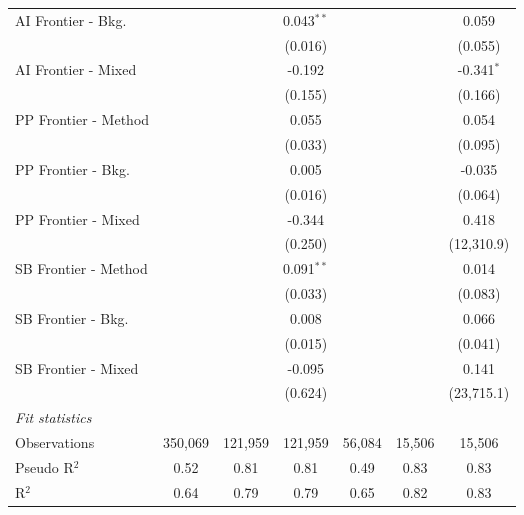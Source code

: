 \begin{tabular}{lcccccc}
   AI Frontier - Bkg.   &               &               & 0.043$^{**}$  &               &              & 0.059\\   
                        &               &               & (0.016)       &               &              & (0.055)\\   
   AI Frontier - Mixed  &               &               & -0.192        &               &              & -0.341$^{*}$\\   
                        &               &               & (0.155)       &               &              & (0.166)\\   
   PP Frontier - Method &               &               & 0.055         &               &              & 0.054\\   
                        &               &               & (0.033)       &               &              & (0.095)\\   
   PP Frontier - Bkg.   &               &               & 0.005         &               &              & -0.035\\   
                        &               &               & (0.016)       &               &              & (0.064)\\   
   PP Frontier - Mixed  &               &               & -0.344        &               &              & 0.418\\   
                        &               &               & (0.250)       &               &              & (12,310.9)\\   
   SB Frontier - Method &               &               & 0.091$^{**}$  &               &              & 0.014\\   
                        &               &               & (0.033)       &               &              & (0.083)\\   
   SB Frontier - Bkg.   &               &               & 0.008         &               &              & 0.066\\   
                        &               &               & (0.015)       &               &              & (0.041)\\   
   SB Frontier - Mixed  &               &               & -0.095        &               &              & 0.141\\   
                        &               &               & (0.624)       &               &              & (23,715.1)\\   
   \midrule
   \emph{Fit statistics}\\
   Observations         & 350,069       & 121,959       & 121,959       & 56,084        & 15,506       & 15,506\\  
   Pseudo R$^2$         & 0.52          & 0.81          & 0.81          & 0.49          & 0.83         & 0.83\\  
   R$^2$                & 0.64          & 0.79          & 0.79          & 0.65          & 0.82         & 0.83\\  
   

\end{tabular}
